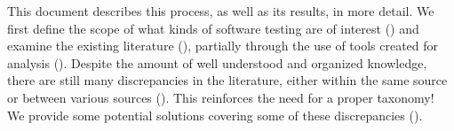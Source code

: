 This document describes this process, as well as its results, in more detail.
We first define the scope of
what kinds of software testing are of interest () and examine the
existing literature ()\ifnotpaper, partially through the use
of tools created for analysis ()\fi. Despite the amount of well
understood and organized knowledge, there are still many discrepancies in the
literature, either within the same source or between various
sources (). This reinforces the need for a proper taxonomy! We
provide some potential solutions covering some of these discrepancies
().

\ifnotpaper
    \begin{bigLandscape}
        
    \end{bigLandscape}
\fi